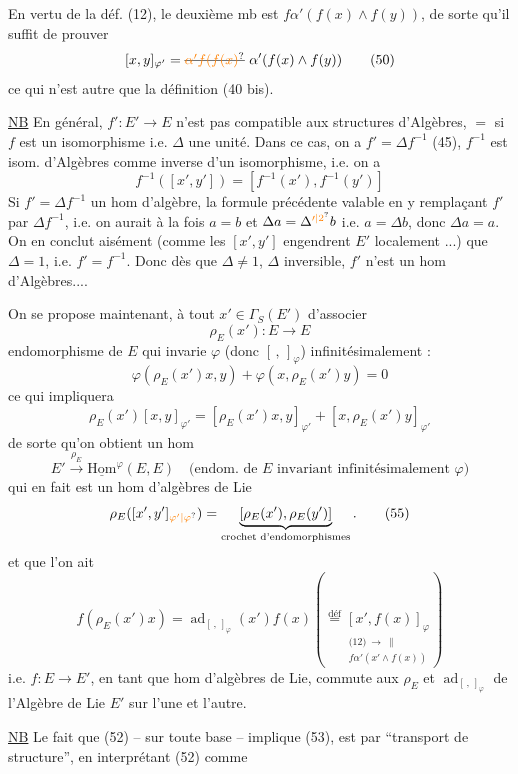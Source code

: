 En vertu de la déf. (12), le deuxième mb est $f\alpha'(f(x)\wedge f(y))$, de sorte qu'il suffit de prouver
\[
 [x,y]_{\varphi'}=\deleted{\unsure{\alpha'f(f(x)}}\ \alpha'(f(x)\wedge f(y)) \tag*{(50)}
\]
ce qui n'est autre que la définition (40 bis).

\uline{NB} En général, $f':E'\to E$ n'est pas compatible aux structures d'Algèbres, $=$ si $f$ est un isomorphisme i.e. $\Delta$ une unité. Dans ce cas, on a $f'=\Delta f^{-1}$ (45),   $f^{-1}$ est  isom. d'Algèbres comme inverse d'un isomorphisme, i.e. on a
\[
 f^{-1}([x',y'])=[f^{-1}(x'),f^{-1}(y')]
\]
Si $f'=\Delta f^{-1}$  un hom d'algèbre, la  formule précédente  valable en y remplaçant $f'$ par $\Delta f^{-1}$, i.e. on aurait à la fois $a=b$ et $\Delta a=\Delta^{\unsure{\prime|2}} b$ i.e. $a=\Delta b$, donc $\Delta a=a$.  On en conclut aisément (comme les $[x',y']$ engendrent $E'$ localement ...) que $\Delta=1$,  i.e. $f'=f^{-1}$. Donc dès que $\Delta\ne1$, $\Delta$ inversible, $f'$ n'est \uline{} un hom d'Algèbres....

On se propose maintenant, à tout $x'\in\Gamma_S(E')$ d'associer
\[
 \rho_E(x'):E\longrightarrow E \tag*{(51)}
\]
 endomorphisme de $E$ qui invarie $\varphi$ (donc $[\, ,\,]_\varphi$) infinitésimalement :
\[
 \varphi(\rho_E(x')x,y)+\varphi(x,\rho_E(x')y)=0 \tag*{(52)}
\]
ce qui impliquera
\[
 \rho_E(x')[x,y]_{\varphi'}=[\rho_E(x')x,y]_{\varphi'}+[x,\rho_E(x')y]_{\varphi'} \tag*{(53)}
\]
de sorte qu'on obtient un hom
\[
 E'\xrightarrow{\rho_E}\underline{\mathrm{Hom}}^{\varphi}(E,E)
 \quad\text{(endom. de $E$ invariant infinitésimalement $\varphi$)} \tag*{(54)}
\]
qui en fait est un hom d'algèbres de Lie
\[
 \rho_E([x',y']_{\unsure{\varphi'|\varphi}})=
 \underbrace{[\rho_E(x'),\rho_E(y')]}_{\text{crochet d'endomorphismes}}. \tag*{(55)}
\]
 et que l'on ait
\[
 f(\rho_E(x')x)=\operatorname{ad}_{[\, ,\,]_\varphi}(x')f(x)
 \left(\overset{\text{déf}}{=}
 \underset{\substack{\text{(12)}\ \longrightarrow\ \parallel\\ f\alpha'(x'\wedge f(x))}}{[x',f(x)]_\varphi}\right) \tag*{(56)}
\]
i.e. $f:E\longrightarrow E'$, en tant que hom d'algèbres de Lie, commute aux   $\rho_E$ et $\operatorname{ad}_{[\, ,\,]_\varphi}$ de l'Algèbre de Lie $E'$ sur l'une et l'autre.

\uline{NB} Le fait que (52) -- sur toute base -- implique (53), est  par ``transport de structure'', en interprétant (52) comme

